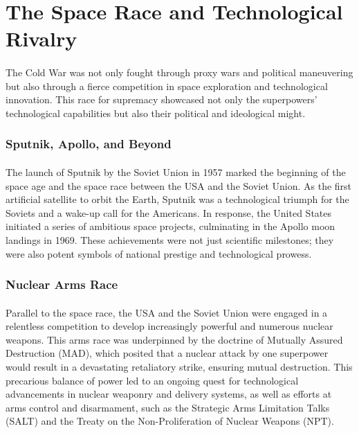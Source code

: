 \documentclass[a4paper,12pt]{book}
\begin{document}
\section*{The Space Race and Technological Rivalry}
\paragraph{}
The Cold War was not only fought through proxy wars and political maneuvering but also through a fierce competition in space exploration and technological innovation. This race for supremacy showcased not only the superpowers’ technological capabilities but also their political and ideological might. 

\subsubsection*{Sputnik, Apollo, and Beyond}
\paragraph{}
The launch of Sputnik by the Soviet Union in 1957 marked the beginning of the space age and the space race between the USA and the Soviet Union. As the first artificial satellite to orbit the Earth, Sputnik was a technological triumph for the Soviets and a wake-up call for the Americans. In response, the United States initiated a series of ambitious space projects, culminating in the Apollo moon landings in 1969. These achievements were not just scientific milestones; they were also potent symbols of national prestige and technological prowess. 

\subsubsection*{Nuclear Arms Race}
\paragraph{}
Parallel to the space race, the USA and the Soviet Union were engaged in a relentless competition to develop increasingly powerful and numerous nuclear weapons. This arms race was underpinned by the doctrine of Mutually Assured Destruction (MAD), which posited that a nuclear attack by one superpower would result in a devastating retaliatory strike, ensuring mutual destruction. This precarious balance of power led to an ongoing quest for technological advancements in nuclear weaponry and delivery systems, as well as efforts at arms control and disarmament, such as the Strategic Arms Limitation Talks (SALT) and the Treaty on the Non-Proliferation of Nuclear Weapons (NPT). 
\end{document}
